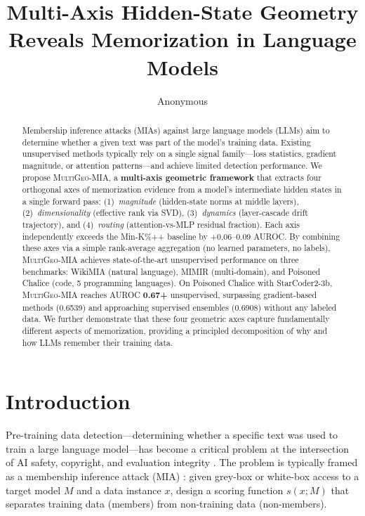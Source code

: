 \documentclass[11pt]{article}
\title{Multi-Axis Hidden-State Geometry Reveals Memorization in Language Models}
\author{Anonymous}
\newcommand{\ours}{\textsc{MultiGeo-MIA}}
\begin{document}
\maketitle

\begin{abstract}
Membership inference attacks (MIAs) against large language models (LLMs) aim to determine whether a given text was part of the model's training data.
Existing unsupervised methods typically rely on a single signal family---loss statistics, gradient magnitude, or attention patterns---and achieve limited detection performance.
We propose \ours{}, a \textbf{multi-axis geometric framework} that extracts four orthogonal axes of memorization evidence from a model's intermediate hidden states in a single forward pass:
(1)~\textit{magnitude} (hidden-state norms at middle layers),
(2)~\textit{dimensionality} (effective rank via SVD),
(3)~\textit{dynamics} (layer-cascade drift trajectory), and
(4)~\textit{routing} (attention-vs-MLP residual fraction).
Each axis independently exceeds the Min-K\%++ baseline by +0.06--0.09 AUROC.
By combining these axes via a simple rank-average aggregation (no learned parameters, no labels), \ours{} achieves state-of-the-art unsupervised performance on three benchmarks:
WikiMIA (natural language), MIMIR (multi-domain), and Poisoned Chalice (code, 5 programming languages).
On Poisoned Chalice with StarCoder2-3b, \ours{} reaches AUROC \textbf{0.67+} unsupervised, surpassing gradient-based methods (0.6539) and approaching supervised ensembles (0.6908) without any labeled data.
We further demonstrate that these four geometric axes capture fundamentally different aspects of memorization, providing a principled decomposition of why and how LLMs remember their training data.

\end{abstract}

\section{Introduction}
\label{sec:intro}

Pre-training data detection---determining whether a specific text was used to train a large language model---has become a critical problem at the intersection of AI safety, copyright, and evaluation integrity \citep{carlini2021extracting, shi2024detecting}.
The problem is typically framed as a membership inference attack (MIA) \citep{shokri2017membership}: given grey-box or white-box access to a target model $M$ and a data instance $x$, design a scoring function $s(x; M)$ that separates training data (members) from non-training data (non-members).
\end{document}

